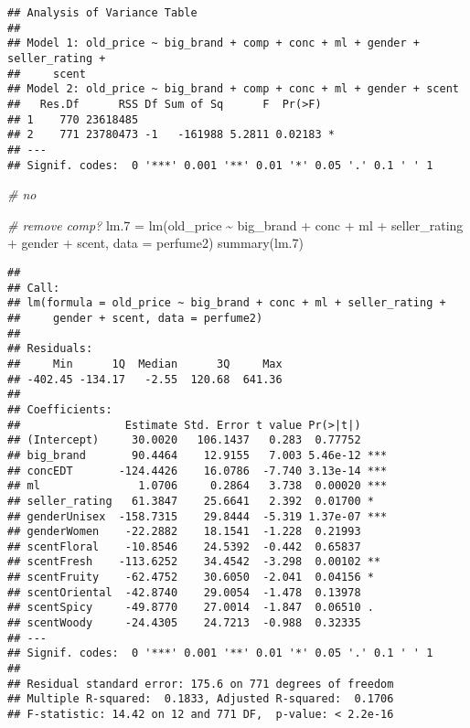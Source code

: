 \documentclass[
]{article}
\newenvironment{Shaded}{\begin{snugshade}}{\end{snugshade}}
\newcommand{\AttributeTok}[1]{\textcolor[rgb]{0.77,0.63,0.00}{#1}}
\newcommand{\CommentTok}[1]{\textcolor[rgb]{0.56,0.35,0.01}{\textit{#1}}}
\newcommand{\FloatTok}[1]{\textcolor[rgb]{0.00,0.00,0.81}{#1}}
\newcommand{\FunctionTok}[1]{\textcolor[rgb]{0.00,0.00,0.00}{#1}}
\newcommand{\NormalTok}[1]{#1}
\newcommand{\OtherTok}[1]{\textcolor[rgb]{0.56,0.35,0.01}{#1}}
\newcommand{\SpecialCharTok}[1]{\textcolor[rgb]{0.00,0.00,0.00}{#1}}
\begin{document}
\begin{verbatim}
## Analysis of Variance Table
## 
## Model 1: old_price ~ big_brand + comp + conc + ml + gender + seller_rating + 
##     scent
## Model 2: old_price ~ big_brand + comp + conc + ml + gender + scent
##   Res.Df      RSS Df Sum of Sq      F  Pr(>F)  
## 1    770 23618485                              
## 2    771 23780473 -1   -161988 5.2811 0.02183 *
## ---
## Signif. codes:  0 '***' 0.001 '**' 0.01 '*' 0.05 '.' 0.1 ' ' 1
\end{verbatim}

\begin{Shaded}
\begin{Highlighting}[]
\CommentTok{\# no}
\end{Highlighting}
\end{Shaded}

\begin{Shaded}
\begin{Highlighting}[]
\CommentTok{\# remove comp?}
\NormalTok{lm}\FloatTok{.7} \OtherTok{=} \FunctionTok{lm}\NormalTok{(old\_price }\SpecialCharTok{\textasciitilde{}}\NormalTok{ big\_brand }\SpecialCharTok{+} 
\NormalTok{            conc }\SpecialCharTok{+}\NormalTok{ ml }\SpecialCharTok{+}\NormalTok{ seller\_rating }\SpecialCharTok{+}
\NormalTok{            gender }\SpecialCharTok{+}\NormalTok{ scent, }\AttributeTok{data =}\NormalTok{ perfume2)}
\FunctionTok{summary}\NormalTok{(lm}\FloatTok{.7}\NormalTok{)}
\end{Highlighting}
\end{Shaded}

\begin{verbatim}
## 
## Call:
## lm(formula = old_price ~ big_brand + conc + ml + seller_rating + 
##     gender + scent, data = perfume2)
## 
## Residuals:
##     Min      1Q  Median      3Q     Max 
## -402.45 -134.17   -2.55  120.68  641.36 
## 
## Coefficients:
##                Estimate Std. Error t value Pr(>|t|)    
## (Intercept)     30.0020   106.1437   0.283  0.77752    
## big_brand       90.4464    12.9155   7.003 5.46e-12 ***
## concEDT       -124.4426    16.0786  -7.740 3.13e-14 ***
## ml               1.0706     0.2864   3.738  0.00020 ***
## seller_rating   61.3847    25.6641   2.392  0.01700 *  
## genderUnisex  -158.7315    29.8444  -5.319 1.37e-07 ***
## genderWomen    -22.2882    18.1541  -1.228  0.21993    
## scentFloral    -10.8546    24.5392  -0.442  0.65837    
## scentFresh    -113.6252    34.4542  -3.298  0.00102 ** 
## scentFruity    -62.4752    30.6050  -2.041  0.04156 *  
## scentOriental  -42.8740    29.0054  -1.478  0.13978    
## scentSpicy     -49.8770    27.0014  -1.847  0.06510 .  
## scentWoody     -24.4305    24.7213  -0.988  0.32335    
## ---
## Signif. codes:  0 '***' 0.001 '**' 0.01 '*' 0.05 '.' 0.1 ' ' 1
## 
## Residual standard error: 175.6 on 771 degrees of freedom
## Multiple R-squared:  0.1833, Adjusted R-squared:  0.1706 
## F-statistic: 14.42 on 12 and 771 DF,  p-value: < 2.2e-16
\end{verbatim}
\end{document}

